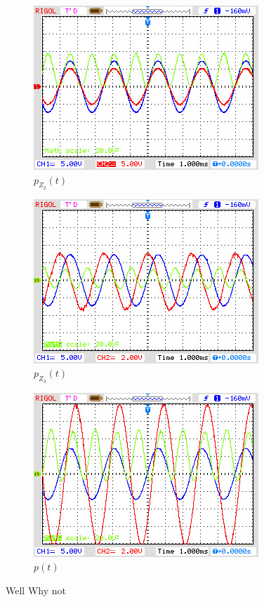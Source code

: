 \begin{figure}[H]
\centering
\includegraphics[width=0.6\linewidth]{Oszi-Bitmaps/NewFile1.jpg}
\caption{$p_{Z_2}(t)$}
\label{fig:MomLKurveZ2}
\end{figure}

\begin{figure}[H]
\centering
\includegraphics[width=0.6\linewidth]{Oszi-Bitmaps/NewFile2.jpg}
\caption{$p_{Z_3}(t)$}
\label{fig:MomLKurveZ3}
\end{figure}

\begin{figure}[H]
\centering
\includegraphics[width=0.6\linewidth]{Oszi-Bitmaps/NewFile3.jpg}
\caption{$p(t)$}
\label{fig:MomLKurveGesamt}
\end{figure}

Well Why not